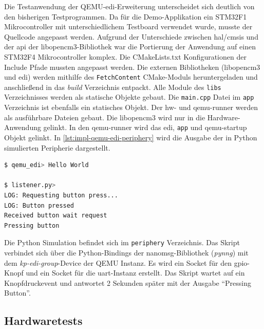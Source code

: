 Die Testanwendung der QEMU-\ac{edi}-Erweiterung unterscheidet sich deutlich von
den bisherigen Testprogrammen.
Da für die Demo-Applikation ein STM32F1 Mikrocontroller mit unterschiedlichem
Testboard verwendet wurde, musste der Quellcode angepasst werden.
Aufgrund der Unterschiede zwischen \ac{hal}/\ac{cmsis} und der \ac{api} der
libopencm3-Bibliothek war die Portierung der Anwendung auf einen STM32F4
Mikrocontroller komplex.
Die CMakeLists.txt Konfigurationen der Include Pfade mussten angepasst werden.
Die externen Bibliotheken (libopencm3 und \ac{edi}) werden mithilfe des
\texttt{FetchContent} CMake-Moduls heruntergeladen und anschließend in das
\textit{build} Verzeichnis entpackt.
Alle Module des \texttt{libs} Verzeichnisses werden als statische Objekte
gebaut.
Die \texttt{main.cpp} Datei im \texttt{app} Verzeichnis ist ebenfalls ein
statisches Objekt.
Der hw- und qemu-runner werden als ausführbare Dateien gebaut.
Die libopencm3 wird nur in die Hardware-Anwendung gelinkt.
In den qemu-runner wird das \ac{edi}, \texttt{app} und qemu-startup Objekt
gelinkt.
In \ref{lst:impl-qemu-edi-periphery} wird die Ausgabe der in Python simulierten
Peripherie dargestellt.
\newline
\begin{minipage}{\linewidth}
\begin{lstlisting}[language=sh,numbers=none,
                label={lst:impl-qemu-edi-periphery},
                caption=Ausgaben der Python Simulation und des QEMU-EDI Monitors]
$ qemu_edi> Hello World

$ listener.py>
LOG: Requesting button press...
LOG: Button pressed
Received button wait request
Pressing button
\end{lstlisting}
\end{minipage}

Die Python Simulation befindet sich im \texttt{periphery} Verzeichnis.
Das Skript verbindet sich über die Python-Bindings der nanomsg-Bibliothek
(\textit{pynng}) mit dem \textit{kp-edi-group}-Device der QEMU Instanz.
Es wird ein Socket für den \ac{gpio}-Knopf und ein Socket für die
\ac{uart}-Instanz erstellt.
Das Skript wartet auf ein Knopfdruckevent und antwortet 2 Sekunden
später mit der Ausgabe \enquote{Pressing Button}.

\subsection{Hardwaretests}

